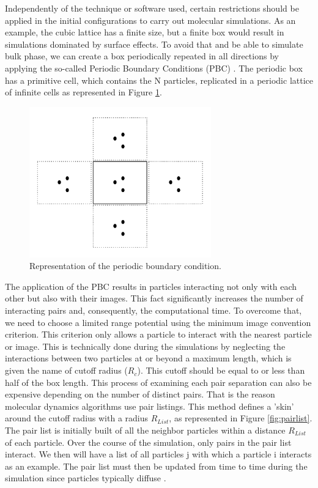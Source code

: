 Independently of the technique or software used, certain restrictions should be applied in the initial configurations to carry out molecular simulations. As an example, the cubic lattice has a finite size, but a finite box would result in simulations dominated by surface effects. To avoid that and be able to simulate bulk phase, we can create a box periodically repeated in all directions by applying the so-called Periodic Boundary Conditions (PBC) \cite{frenkel}. The periodic box has a primitive cell, which contains the N particles, replicated in a periodic lattice of infinite cells as represented in Figure \ref{fig:pbc}. 

\begin{figure}[h]
	\centering
	\includegraphics[width=0.7\textwidth]{Figures/pbc}
	\caption{Representation of the periodic boundary condition.}
	\label{fig:pbc}
\end{figure}

The application of the PBC results in particles interacting not only with each other but also with their images. This fact significantly increases the number of interacting pairs and, consequently, the computational time. To overcome that, we need to choose a limited range potential using the minimum image convention criterion. This criterion only allows a particle to interact with the nearest particle or image.  This is technically done during the simulations by neglecting the interactions between two particles at or beyond a maximum length, which is given the name of cutoff radius ($R_{c}$). This cutoff should be equal to or less than half of the box length. This process of examining each pair separation can also be expensive depending on the number of distinct pairs. That is the reason molecular dynamics algorithms use pair listings. This method defines a 'skin' around the cutoff radius with a radius $R_{List}$, as represented in Figure \ref{fig:pairlist}. The pair list is initially built of all the neighbor particles within a distance $R_{List}$ of each particle. Over the course of the simulation, only pairs in the pair list interact. We then will have a list of all particles j with which a particle i interacts as an example. The pair list must then be updated from time to time during the simulation since particles typically diffuse \cite{tuckerman}.    

